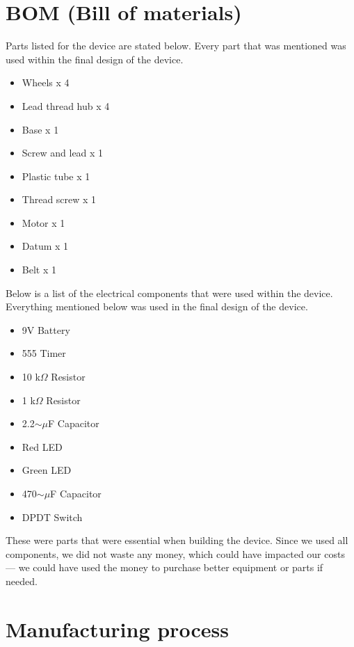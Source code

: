 \documentclass{article}
\begin{document}
\section{BOM (Bill of materials)}
Parts listed for the device are stated below. Every part that was mentioned was used within the final design of the device.
\begin{itemize}[itemsep=-1mm]
	\item Wheels x 4
	\item Lead thread hub x 4
	\item Base x 1
	\item Screw and lead x 1
	\item Plastic tube x 1
	\item Thread screw x 1
	\item Motor x 1
	\item Datum x 1
	\item Belt x 1
\end{itemize}\noindent
Below is a list of the electrical components that were used within the device. Everything mentioned below was used in the final design of the device.
\begin{itemize}[itemsep=-1mm]
	\item 9V Battery
	\item 555 Timer
	\item 10 k$\Omega$ Resistor
	\item 1 k$\Omega$ Resistor
	\item 2.2$\sim\mu$F Capacitor
	\item Red LED
	\item Green LED
	\item 470$\sim\mu$F Capacitor
	\item DPDT Switch
\end{itemize}
These were parts that were essential when building the device. Since we used all components, we did not waste any money, which could have impacted our costs — we could have used the money to purchase better equipment or parts if needed.

\newpage
\section{Manufacturing process}


\newpage\vspace*{-20pt}
\end{document}
